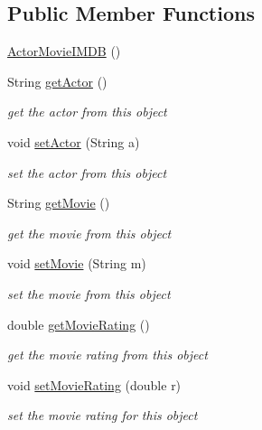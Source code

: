 \subsection*{Public Member Functions}
\begin{DoxyCompactItemize}
\item 
\hyperlink{classbridges_1_1data__src__dependent_1_1_actor_movie_i_m_d_b_a5265e7b8ba0613497fae0f4125882413}{Actor\+Movie\+I\+M\+DB} ()
\item 
String \hyperlink{classbridges_1_1data__src__dependent_1_1_actor_movie_i_m_d_b_a59c20f1a3e718ba11fefac6818cf67ee}{get\+Actor} ()
\begin{DoxyCompactList}\small\item\em get the actor from this object \end{DoxyCompactList}\item 
void \hyperlink{classbridges_1_1data__src__dependent_1_1_actor_movie_i_m_d_b_aa45eca34d84928109ff8439c30e2dd56}{set\+Actor} (String a)
\begin{DoxyCompactList}\small\item\em set the actor from this object \end{DoxyCompactList}\item 
String \hyperlink{classbridges_1_1data__src__dependent_1_1_actor_movie_i_m_d_b_af44503937d5b0d23a2347e752f435a32}{get\+Movie} ()
\begin{DoxyCompactList}\small\item\em get the movie from this object \end{DoxyCompactList}\item 
void \hyperlink{classbridges_1_1data__src__dependent_1_1_actor_movie_i_m_d_b_a4747fd2c81481d366d566a6536186d9e}{set\+Movie} (String m)
\begin{DoxyCompactList}\small\item\em set the movie from this object \end{DoxyCompactList}\item 
double \hyperlink{classbridges_1_1data__src__dependent_1_1_actor_movie_i_m_d_b_a3c13fb368acf3daf652dcaec37ae4809}{get\+Movie\+Rating} ()
\begin{DoxyCompactList}\small\item\em get the movie rating from this object \end{DoxyCompactList}\item 
void \hyperlink{classbridges_1_1data__src__dependent_1_1_actor_movie_i_m_d_b_a770bf71b928f997301aab76af5c9b886}{set\+Movie\+Rating} (double r)
\begin{DoxyCompactList}\small\item\em set the movie rating for this object \end{DoxyCompactList}\item 

\end{DoxyCompactItemize}
